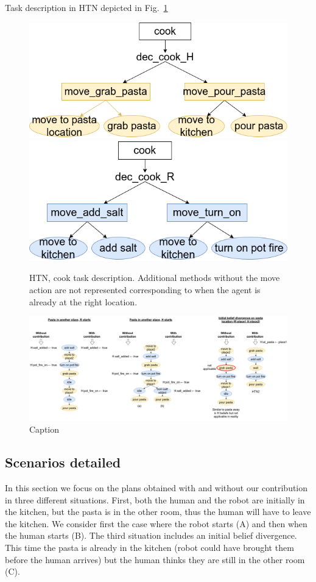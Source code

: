 \documentclass[letterpaper]{article} %
\begin{document}
Task description in HTN depicted in Fig.~\ref{fig:htn}

\begin{figure}
    \centering
    \includegraphics[width=0.4\linewidth]{figures/htn_human.png}
    \includegraphics[width=0.4\linewidth]{figures/htn_robot.png}
    \caption{HTN, cook task description. Additional methods without the move action are not represented corresponding to when the agent is already at the right location.}
    \label{fig:htn}
\end{figure}



\begin{figure}
    \centering
    \includegraphics[width=\linewidth]{figures/example_cook.png}
    \caption{Caption}
    \label{fig:scenarios}
\end{figure}


\subsection{Scenarios detailed}

In this section we focus on the plans obtained with and without our contribution in three different situations. First, both the human and the robot are initially in the kitchen, but the pasta is in the other room, thus the human will have to leave the kitchen. We consider first the case where the robot starts (A) and then when the human starts (B). The third situation includes an initial belief divergence. This time the pasta is already in the kitchen (robot could have brought them before the human arrives) but the human thinks they are still in the other room (C).  
\end{document}
